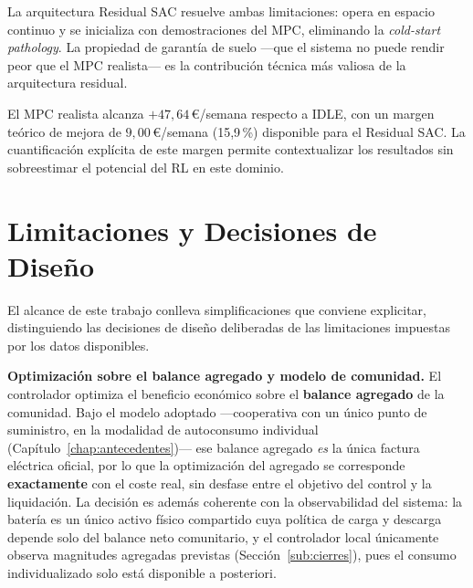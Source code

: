 \documentclass[12pt, a4paper, twoside]{report}
\begin{document}
La arquitectura Residual SAC resuelve ambas limitaciones: opera en espacio
continuo y se inicializa con demostraciones del MPC, eliminando la
\textit{cold-start pathology}. La propiedad de garantía de suelo —que el
sistema no puede rendir peor que el MPC realista— es la contribución técnica
más valiosa de la arquitectura residual.

El MPC realista alcanza $+47{,}64$\,€/semana respecto a IDLE,
con un margen teórico de mejora de $9{,}00$\,€/semana (15{,}9\,\%) disponible
para el Residual SAC. La cuantificación explícita de este margen permite
contextualizar los resultados sin sobreestimar el potencial del RL en este
dominio.

\section{Limitaciones y Decisiones de Diseño}
\label{sec:limitaciones}

El alcance de este trabajo conlleva simplificaciones que conviene explicitar,
distinguiendo las decisiones de diseño deliberadas de las limitaciones impuestas
por los datos disponibles.

\textbf{Optimización sobre el balance agregado y modelo de comunidad.} El
controlador optimiza el beneficio económico sobre el \textbf{balance agregado} de
la comunidad. Bajo el modelo adoptado —cooperativa con un único punto de
suministro, en la modalidad de autoconsumo individual
(Capítulo~\ref{chap:antecedentes})— ese balance agregado \emph{es} la única
factura eléctrica oficial, por lo que la optimización del agregado se corresponde
\textbf{exactamente} con el coste real, sin desfase entre el objetivo del control
y la liquidación. La decisión es además coherente con la observabilidad del
sistema: la batería es un único activo físico compartido cuya política de carga y
descarga depende solo del balance neto comunitario, y el controlador local
únicamente observa magnitudes agregadas previstas (Sección~\ref{sub:cierres}),
pues el consumo individualizado solo está disponible a posteriori.
\end{document}
